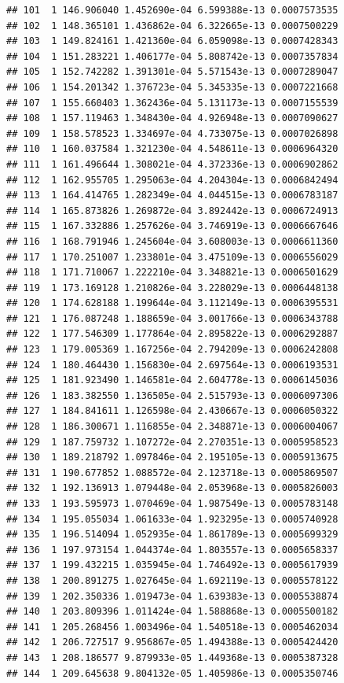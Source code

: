 \documentclass[article]{jss}\usepackage[]{graphicx}\usepackage[]{xcolor}
\makeatletter
\newenvironment{kframe}{%
 \def\at@end@of@kframe{}%
 \ifinner\ifhmode%
  \def\at@end@of@kframe{\end{minipage}}%
  \begin{minipage}{\columnwidth}%
 \fi\fi%
 \def\FrameCommand##1{\hskip\@totalleftmargin \hskip-\fboxsep
 \colorbox{shadecolor}{##1}\hskip-\fboxsep
     \hskip-\linewidth \hskip-\@totalleftmargin \hskip\columnwidth}%
 \MakeFramed {\advance\hsize-\width
   \@totalleftmargin\z@ \linewidth\hsize
   \@setminipage}}%
 {\par\unskip\endMakeFramed%
 \at@end@of@kframe}
\newenvironment{knitrout}{}{} %
\makeatother
\begin{document}
\begin{knitrout}
\begin{kframe}
\begin{verbatim}
## 101  1 146.906040 1.452690e-04 6.599388e-13 0.0007573535
## 102  1 148.365101 1.436862e-04 6.322665e-13 0.0007500229
## 103  1 149.824161 1.421360e-04 6.059098e-13 0.0007428343
## 104  1 151.283221 1.406177e-04 5.808742e-13 0.0007357834
## 105  1 152.742282 1.391301e-04 5.571543e-13 0.0007289047
## 106  1 154.201342 1.376723e-04 5.345335e-13 0.0007221668
## 107  1 155.660403 1.362436e-04 5.131173e-13 0.0007155539
## 108  1 157.119463 1.348430e-04 4.926948e-13 0.0007090627
## 109  1 158.578523 1.334697e-04 4.733075e-13 0.0007026898
## 110  1 160.037584 1.321230e-04 4.548611e-13 0.0006964320
## 111  1 161.496644 1.308021e-04 4.372336e-13 0.0006902862
## 112  1 162.955705 1.295063e-04 4.204304e-13 0.0006842494
## 113  1 164.414765 1.282349e-04 4.044515e-13 0.0006783187
## 114  1 165.873826 1.269872e-04 3.892442e-13 0.0006724913
## 115  1 167.332886 1.257626e-04 3.746919e-13 0.0006667646
## 116  1 168.791946 1.245604e-04 3.608003e-13 0.0006611360
## 117  1 170.251007 1.233801e-04 3.475109e-13 0.0006556029
## 118  1 171.710067 1.222210e-04 3.348821e-13 0.0006501629
## 119  1 173.169128 1.210826e-04 3.228029e-13 0.0006448138
## 120  1 174.628188 1.199644e-04 3.112149e-13 0.0006395531
## 121  1 176.087248 1.188659e-04 3.001766e-13 0.0006343788
## 122  1 177.546309 1.177864e-04 2.895822e-13 0.0006292887
## 123  1 179.005369 1.167256e-04 2.794209e-13 0.0006242808
## 124  1 180.464430 1.156830e-04 2.697564e-13 0.0006193531
## 125  1 181.923490 1.146581e-04 2.604778e-13 0.0006145036
## 126  1 183.382550 1.136505e-04 2.515793e-13 0.0006097306
## 127  1 184.841611 1.126598e-04 2.430667e-13 0.0006050322
## 128  1 186.300671 1.116855e-04 2.348871e-13 0.0006004067
## 129  1 187.759732 1.107272e-04 2.270351e-13 0.0005958523
## 130  1 189.218792 1.097846e-04 2.195105e-13 0.0005913675
## 131  1 190.677852 1.088572e-04 2.123718e-13 0.0005869507
## 132  1 192.136913 1.079448e-04 2.053968e-13 0.0005826003
## 133  1 193.595973 1.070469e-04 1.987549e-13 0.0005783148
## 134  1 195.055034 1.061633e-04 1.923295e-13 0.0005740928
## 135  1 196.514094 1.052935e-04 1.861789e-13 0.0005699329
## 136  1 197.973154 1.044374e-04 1.803557e-13 0.0005658337
## 137  1 199.432215 1.035945e-04 1.746492e-13 0.0005617939
## 138  1 200.891275 1.027645e-04 1.692119e-13 0.0005578122
## 139  1 202.350336 1.019473e-04 1.639383e-13 0.0005538874
## 140  1 203.809396 1.011424e-04 1.588868e-13 0.0005500182
## 141  1 205.268456 1.003496e-04 1.540518e-13 0.0005462034
## 142  1 206.727517 9.956867e-05 1.494388e-13 0.0005424420
## 143  1 208.186577 9.879933e-05 1.449368e-13 0.0005387328
## 144  1 209.645638 9.804132e-05 1.405986e-13 0.0005350746

\end{verbatim}
\end{kframe}
\end{knitrout}
\end{document}
